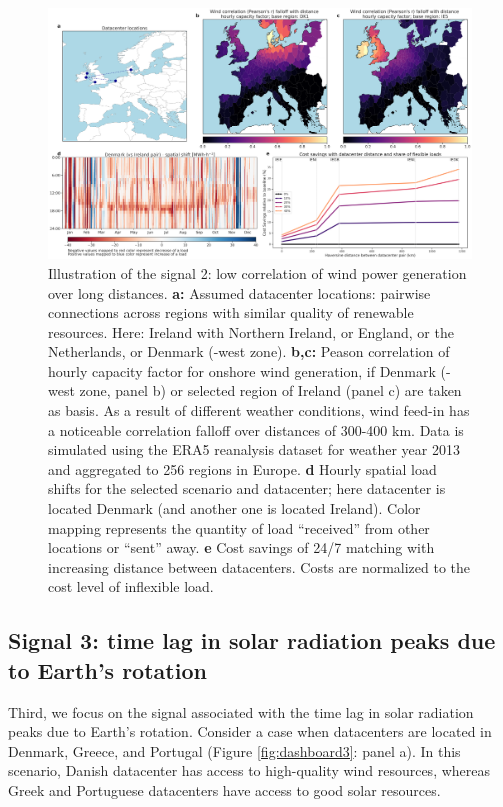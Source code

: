 \begin{figure}
    \centering
    \includegraphics[width=\textwidth]{img/dashboard_2.png}
    \caption{Illustration of the signal 2: low correlation of wind power generation over long distances.
    \textbf{a:} Assumed datacenter locations: pairwise connections across regions with similar quality of renewable resources. Here: Ireland with Northern Ireland, or England, or the Netherlands, or Denmark (-west zone).
    \textbf{b,c:} Peason correlation of hourly capacity factor for onshore wind generation, if Denmark (-west zone, panel b) or selected region of Ireland (panel c) are taken as basis. As a result of different weather conditions, wind feed-in has a noticeable correlation falloff over distances of 300-400 km. Data is simulated using the ERA5 reanalysis dataset for weather year 2013 and aggregated to 256 regions in Europe.
    \textbf{d} Hourly spatial load shifts for the selected scenario and datacenter; here datacenter is located Denmark (and another one is located Ireland). Color mapping represents the quantity of load \enquote{received} from other locations or \enquote{sent} away.
    \textbf{e} Cost savings of 24/7 matching with increasing distance between datacenters. Costs are normalized to the cost level of inflexible load.}
    \label{fig:dashboard2}
\end{figure}


\subsection{Signal 3: time lag in solar radiation peaks due to Earth's rotation}

Third, we focus on the signal associated with the time lag in solar radiation peaks due to Earth's rotation. Consider a case when datacenters are located in Denmark, Greece, and Portugal (Figure \ref{fig:dashboard3}: panel a). In this scenario, Danish datacenter has access to high-quality wind resources, whereas Greek and Portuguese datacenters have access to good solar resources.

